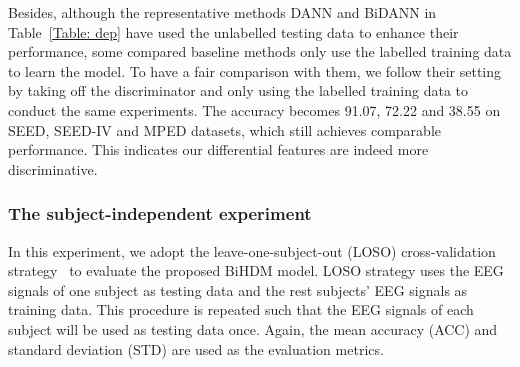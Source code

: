 \documentclass[journal]{IEEEtran}
\begin{document}
Besides,  although the representative methods DANN and BiDANN in Table~\ref{Table: dep} have used the unlabelled testing data to enhance their performance, some compared baseline methods only use the labelled training data to learn the model. To have a fair comparison with them, we follow their setting by taking off the discriminator and only using the labelled training data to conduct the same experiments. The accuracy becomes 91.07, 72.22 and 38.55 on SEED, SEED-IV and MPED datasets, which still achieves comparable performance. This indicates our differential features are indeed more discriminative.

\subsubsection{The subject-independent experiment}
In this experiment, we adopt the leave-one-subject-out (LOSO) cross-validation strategy~\cite{zheng2016personalizing} to evaluate the proposed BiHDM model. LOSO strategy uses the EEG signals of one subject as testing data and the rest subjects' EEG signals as training data. This procedure is repeated such that the EEG signals of each subject will be used as testing data once. Again, the mean accuracy (ACC) and standard deviation (STD) are used as the evaluation metrics. 
\end{document}
